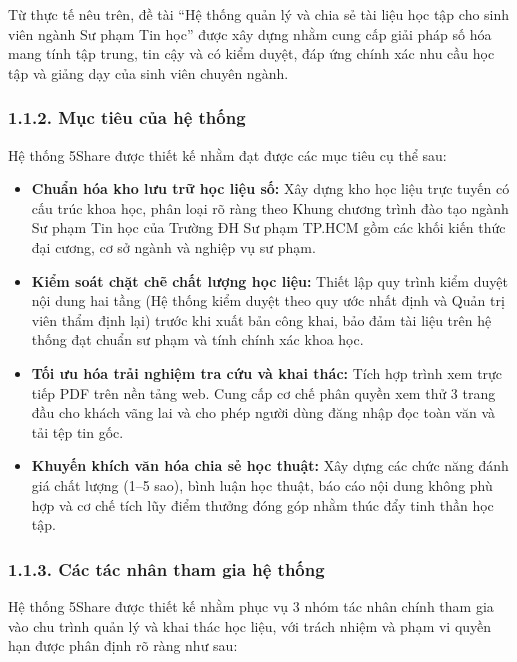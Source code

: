 Từ thực tế nêu trên, đề tài ``Hệ thống quản lý và chia sẻ tài liệu học tập cho sinh viên ngành Sư phạm Tin học'' được xây dựng nhằm cung cấp giải pháp số hóa mang tính tập trung, tin cậy và có kiểm duyệt, đáp ứng chính xác nhu cầu học tập và giảng dạy của sinh viên chuyên ngành.

\subsubsection{1.1.2. Mục tiêu của hệ thống}
Hệ thống 5Share được thiết kế nhằm đạt được các mục tiêu cụ thể sau:
\begin{itemize}[leftmargin=*,noitemsep]
    \item \textbf{Chuẩn hóa kho lưu trữ học liệu số:} Xây dựng kho học liệu trực tuyến có cấu trúc khoa học, phân loại rõ ràng theo Khung chương trình đào tạo ngành Sư phạm Tin học của Trường ĐH Sư phạm TP.HCM gồm các khối kiến thức đại cương, cơ sở ngành và nghiệp vụ sư phạm.
    \item \textbf{Kiểm soát chặt chẽ chất lượng học liệu:} Thiết lập quy trình kiểm duyệt nội dung hai tầng (Hệ thống kiểm duyệt theo quy ước nhất định và Quản trị viên thẩm định lại) trước khi xuất bản công khai, bảo đảm tài liệu trên hệ thống đạt chuẩn sư phạm và tính chính xác khoa học.
    \item \textbf{Tối ưu hóa trải nghiệm tra cứu và khai thác:} Tích hợp trình xem trực tiếp PDF trên nền tảng web. Cung cấp cơ chế phân quyền xem thử 3 trang đầu cho khách vãng lai và cho phép người dùng đăng nhập đọc toàn văn và tải tệp tin gốc.
    \item \textbf{Khuyến khích văn hóa chia sẻ học thuật:} Xây dựng các chức năng đánh giá chất lượng (1--5 sao), bình luận học thuật, báo cáo nội dung không phù hợp và cơ chế tích lũy điểm thưởng đóng góp nhằm thúc đẩy tinh thần học tập.
\end{itemize}

\subsubsection{1.1.3. Các tác nhân tham gia hệ thống}
Hệ thống 5Share được thiết kế nhằm phục vụ 3 nhóm tác nhân chính tham gia vào chu trình quản lý và khai thác học liệu, với trách nhiệm và phạm vi quyền hạn được phân định rõ ràng như sau:

